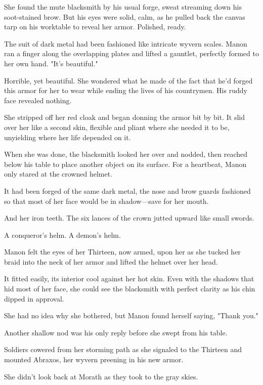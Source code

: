 She found the mute blacksmith by his usual forge, sweat streaming down his soot-stained brow.
But his eyes were solid, calm, as he pulled back the canvas tarp on his worktable to reveal her armor.
Polished, ready. 

The suit of dark metal had been fashioned like intricate wyvern scales.
Manon ran a finger along the overlapping plates and lifted a gauntlet, perfectly formed to her own hand.
"It's beautiful."

Horrible, yet beautiful.
She wondered what he made of the fact that he'd forged this armor for her to wear while ending the lives of his countrymen.
His ruddy face revealed nothing.

She stripped off her red cloak and began donning the armor bit by bit.
It slid over her like a second skin, flexible and pliant where she needed it to be, unyielding where her life depended on it.

When she was done, the blacksmith looked her over and nodded, then reached below his table to place another object on its surface.
For a heartbeat, Manon only stared at the crowned helmet.

It had been forged of the same dark metal, the nose and brow guards fashioned so that most of her face would be in shadow---save for her mouth.

And her iron teeth.
The six lances of the crown jutted upward like small swords.

A conqueror's helm.
A demon's helm.

Manon felt the eyes of her Thirteen, now armed, upon her as she tucked her braid into the neck of her armor and lifted the helmet over her head.

It fitted easily, its interior cool against her hot skin.
Even with the shadows that hid most of her face, she could see the blacksmith with perfect clarity as his chin dipped in approval.

She had no idea why she bothered, but Manon found herself saying, "Thank you."

Another shallow nod was his only reply before she swept from his table.

Soldiers cowered from her storming path as she signaled to the Thirteen and mounted Abraxos, her wyvern preening in his new armor.

She didn't look back at Morath as they took to the gray skies.
